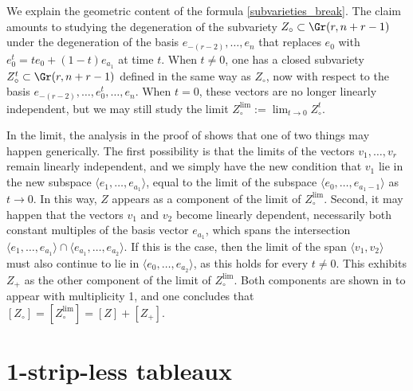 
\begin{rema}\label{subvarieties_break_rmk}
We explain the geometric content of the formula \eqref{subvarieties_break}. The claim amounts to studying the degeneration of the subvariety $Z_\circ\subset \Gr(r,n+r-1)$ under the degeneration of the basis $e_{-(r-2)},\ldots,e_n$ that replaces $e_0$ with $e_0^t=te_0+(1-t)e_{a_1}$ at time $t$. When $t\neq0$, one has a closed subvariety $Z^t_\circ\subset \Gr(r,n+r-1)$ defined in the same way as $Z_\circ$, now with respect to the basis $e_{-(r-2)},\ldots,e_0^t,\ldots,e_n$. When $t=0$, these vectors are no longer linearly independent, but we may still study the limit $Z^{\lim}_\circ:=\lim_{t\to 0}Z^t_\circ$.

In the limit, the analysis in the proof of \cite[Theorem 3.32]{Cos09} shows  that one of two things may happen generically. The first possibility is that the limits of the vectors $v_1,\ldots,v_r$ remain linearly independent, and we simply have the new condition that $v_1$ lie in the new subspace $\langle e_1,\ldots,e_{a_1}\rangle$, equal to the limit of the subspace $\langle e_0,\ldots,e_{a_1-1}\rangle$ as $t\to 0$. In this way, $Z$ appears as a component of the limit of $Z^{\lim}_\circ$. Second, it may happen that the vectors $v_1$ and $v_2$ become linearly dependent, necessarily both constant multiples of the basis vector $e_{a_1}$, which spans the intersection $\langle e_1,\ldots,e_{a_1}\rangle\cap \langle e_{a_1},\ldots,e_{a_2}\rangle$. If this is the case, then the limit of the span $\langle v_1,v_2\rangle$ must also continue to lie in $\langle e_0,\ldots,e_{a_2}\rangle$, as this holds for every $t\neq0$. This exhibits $Z_+$ as the other component of the limit of $Z^{\lim}_\circ$. Both components are shown in \cite{Cos09} to appear with multiplicity 1, and one concludes that $[Z_\circ]=[Z^{\lim}_\circ]=[Z]+[Z_+]$.
\end{rema}

\section{1-strip-less tableaux}\label{stripless_sec}

